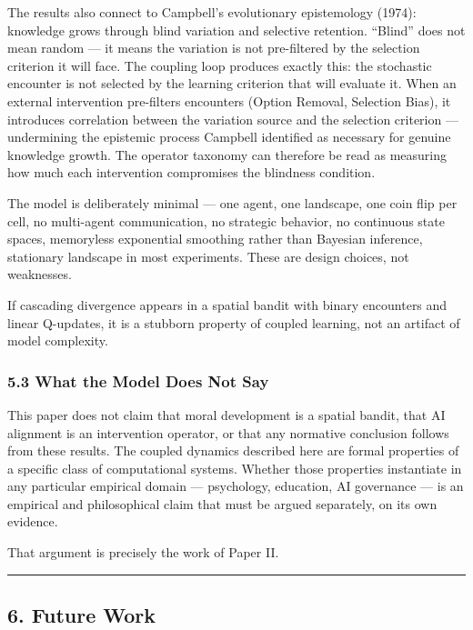 \documentclass[
]{article}
\begin{document}
The results also connect to Campbell's evolutionary epistemology (1974):
knowledge grows through blind variation and selective retention.
``Blind'' does not mean random --- it means the variation is not
pre-filtered by the selection criterion it will face. The coupling loop
produces exactly this: the stochastic encounter is not selected by the
learning criterion that will evaluate it. When an external intervention
pre-filters encounters (Option Removal, Selection Bias), it introduces
correlation between the variation source and the selection criterion ---
undermining the epistemic process Campbell identified as necessary for
genuine knowledge growth. The operator taxonomy can therefore be read as
measuring how much each intervention compromises the blindness
condition.

The model is deliberately minimal --- one agent, one landscape, one coin
flip per cell, no multi-agent communication, no strategic behavior, no
continuous state spaces, memoryless exponential smoothing rather than
Bayesian inference, stationary landscape in most experiments. These are
design choices, not weaknesses.

If cascading divergence appears in a spatial bandit with binary
encounters and linear Q-updates, it is a stubborn property of coupled
learning, not an artifact of model complexity.

\subsubsection{5.3 What the Model Does Not
Say}\label{what-the-model-does-not-say}

This paper does not claim that moral development is a spatial bandit,
that AI alignment is an intervention operator, or that any normative
conclusion follows from these results. The coupled dynamics described
here are formal properties of a specific class of computational systems.
Whether those properties instantiate in any particular empirical domain
--- psychology, education, AI governance --- is an empirical and
philosophical claim that must be argued separately, on its own evidence.

That argument is precisely the work of Paper II.

\begin{center}\rule{0.5\linewidth}{0.5pt}\end{center}

\subsection{6. Future Work}\label{future-work}
\end{document}
